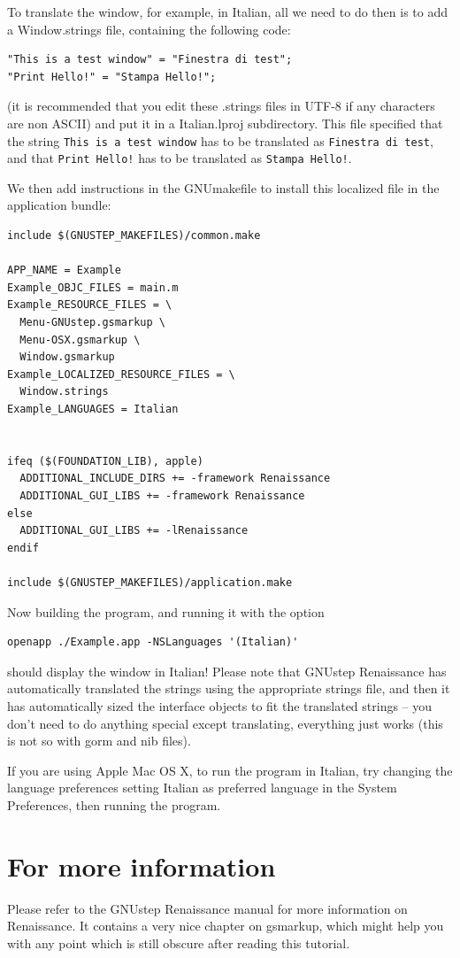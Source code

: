 \documentclass[a4paper]{article}
\begin{document}
To translate the window, for example, in Italian, all we need to do
then is to add a Window.strings file, containing the following code:
\begin{verbatim}
"This is a test window" = "Finestra di test";
"Print Hello!" = "Stampa Hello!";
\end{verbatim}
(it is recommended that you edit these .strings files in UTF-8 if any
characters are non ASCII) and put it in a Italian.lproj subdirectory.
This file specified that the string \texttt{This is a test window} has
to be translated as \texttt{Finestra di test}, and that \texttt{Print
Hello!} has to be translated as \texttt{Stampa Hello!}.

We then add instructions in the GNUmakefile to install this localized
file in the application bundle:
\begin{verbatim}
include $(GNUSTEP_MAKEFILES)/common.make

APP_NAME = Example
Example_OBJC_FILES = main.m
Example_RESOURCE_FILES = \
  Menu-GNUstep.gsmarkup \
  Menu-OSX.gsmarkup \
  Window.gsmarkup
Example_LOCALIZED_RESOURCE_FILES = \
  Window.strings
Example_LANGUAGES = Italian


ifeq ($(FOUNDATION_LIB), apple)
  ADDITIONAL_INCLUDE_DIRS += -framework Renaissance
  ADDITIONAL_GUI_LIBS += -framework Renaissance
else
  ADDITIONAL_GUI_LIBS += -lRenaissance
endif

include $(GNUSTEP_MAKEFILES)/application.make
\end{verbatim}

Now building the program, and running it with the option
\begin{verbatim}
openapp ./Example.app -NSLanguages '(Italian)' 
\end{verbatim}
should display the window in Italian!  Please note that GNUstep
Renaissance has automatically translated the strings using the
appropriate strings file, and then it has automatically sized the
interface objects to fit the translated strings -- you don't need to
do anything special except translating, everything just works (this is
not so with gorm and nib files).

If you are using Apple Mac OS X, to run the program in Italian, try
changing the language preferences setting Italian as preferred
language in the System Preferences, then running the program.

\section{For more information}
Please refer to the GNUstep Renaissance manual for more information on
Renaissance.  It contains a very nice chapter on gsmarkup, which might
help you with any point which is still obscure after reading this
tutorial.
\end{document}
